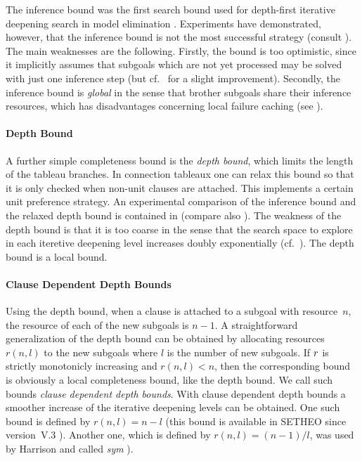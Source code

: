 The inference bound was the first search bound used for depth-first
iterative deepening search in model elimination \cite{Sti88}. 
Experiments have demonstrated, however, that the inference bound is
not the most successful strategy (consult \cite{LSBB92}).
The main weaknesses are the following.
Firstly, the bound is too optimistic, since it implicitly assumes that
subgoals which are not yet processed may be solved with just one
inference step (but cf.\ \cite{Har96} for a slight improvement). 
Secondly, the inference bound is {\em global\/} in the sense that
brother subgoals share their inference resources, which has
disadvantages concerning local failure caching (see \cite{LI96}).



\paragraph{Depth Bound}
A further simple completeness bound is the {\em depth bound}, 
which limits the length of the tableau branches.
In connection tableaux one can relax this bound so that it is only 
checked when non-unit clauses are attached.
This implements a certain unit preference strategy.
An experimental comparison of the inference bound and the relaxed 
depth bound is contained in \cite{LSBB92} (compare also
\cite{Har96}). 
The weakness of the depth bound is that it is too coarse in the sense
that the search space to explore in each iteretive deepening level
increases doubly exponentially (cf.\ \cite{LI96}).
The depth bound is a local bound.


\paragraph{Clause Dependent Depth Bounds} 
Using the depth bound, when a clause is attached to a subgoal with 
resource~$n$, the resource of each of the new subgoals is $n-1$.
A straightforward generalization of the depth bound can be obtained by
allocating resources~$r(n,l)$ to the new subgoals where $l$ is the
number of new subgoals.
If $r\/$ is strictly monotonicly increasing and $r(n,l) < n$, then the
corresponding bound is obviously a local completeness bound, like the
depth bound. 
We call such bounds {\em clause dependent depth bounds}.
With clause dependent depth bounds a smoother increase of the
iterative deepening levels can be obtained.
One such bound is defined by $r(n,l) = n-l$ (this bound is available
in SETHEO since version~V.3 \cite{GLMS94}).
Another one, which is defined by $r(n,l) = (n-1)/l$, was used by
Harrison and called {\em sym} \cite{Har96}).


